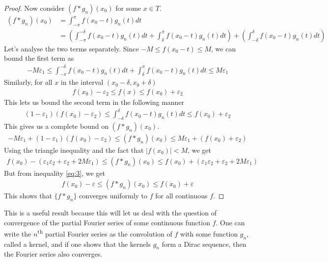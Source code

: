 \documentclass[12pt, titlepage]{article}
\theoremstyle{definition}
\newcommand{\vep}{\varepsilon}
\begin{document}
\begin{proof}
    Now consider $(f \ast g_n)(x_0)$ for some $x \in T$.
    \begin{align*}
        (f \ast g_n)(x_0) &= \int_{-\pi}^{\pi} f(x_0-t) g_n(t) dt \\
        &= \left( \int_{-\pi}^{-\delta} f(x_0-t) g_n(t) dt + \int_{\delta}^{\pi} f(x_0-t) g_n(t) dt \right) + \left( \int_{-\delta}^{\delta} f(x_0-t) g_n(t) dt \right)
    \end{align*}
    Let's analyse the two terms separately. Since $-M \leq f(x_0-t) \leq M$, we can bound the first term as
    \begin{align*}
        -M\vep_1 \leq \int_{-\pi}^{-\delta} f(x_0-t) g_n(t) dt + \int_{\delta}^{\pi} f(x_0-t) g_n(t) dt \leq M\vep_1
    \end{align*}
    Similarly, for all $x$ in the interval $(x_0 -\delta, x_0 + \delta)$
    \begin{align*}
        f(x_0) - \vep_2 \leq f(x) \leq f(x_0) + \vep_2
    \end{align*}
    This lets us bound the second term in the following manner
    \begin{align*}
        (1- \vep_1)(f(x_0) - \vep_2) \leq \int_{-\delta}^{\delta} f(x_0 - t)g_n(t) dt \leq f(x_0) + \vep_2
    \end{align*}
    This gives us a complete bound on $(f \ast g_n)(x_0)$.
    \begin{align*}
        -M\vep_1 + (1 - \vep_1)(f(x_0) - \vep_2) \leq (f \ast g_n)(x_0) \leq M\vep_1 + (f(x_0) + \vep_2)
    \end{align*}
    Using the triangle inequality and the fact that $|f(x_0)| < M$, we get
    \begin{align*}
        f(x_0) - (\vep_1 \vep_2 + \vep_2 + 2M\vep_1) \leq (f \ast g_n)(x_0) \leq f(x_0) + (\vep_1 \vep_2 + \vep_2 + 2M\vep_1)
    \end{align*}
    But from inequality \ref{eq:3}, we get
    \begin{align*}
        f(x_0) - \vep \leq (f \ast g_n)(x_0) \leq f(x_0) + \vep
    \end{align*}
    This shows that $\{f \ast g_n\}$ converges uniformly to $f$ for all continuous $f$.
\end{proof}

This is a useful result because this will let us deal with the question of convergence of the partial Fourier series of some continuous function $f$. One can write the $n$\textsuperscript{th} partial Fourier series as the convolution of $f$ with some function $g_n$, called a kernel, and if one shows that the kernels $g_n$ form a Dirac sequence, then the Fourier series also converges.
\end{document}
